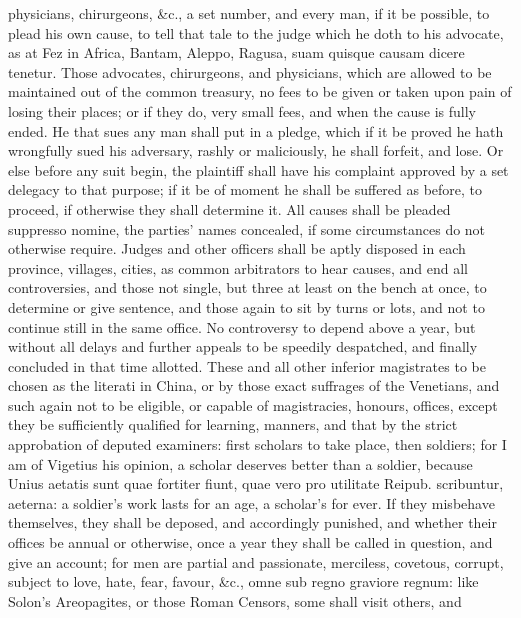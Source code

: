 {physicians, chirurgeons, \&c., a set number, and every man, if it
be possible, to plead his own cause, to tell that tale to the judge
which he doth to his advocate, as at Fez in Africa, Bantam, Aleppo,
Ragusa, suam quisque causam dicere tenetur. Those advocates,
chirurgeons, and physicians, which are allowed to be maintained
out of the common treasury, no fees to be given or taken upon pain
of losing their places; or if they do, very small fees, and when the
cause is fully ended. He that sues any man shall put in a
pledge, which if it be proved he hath wrongfully sued his adversary,
rashly or maliciously, he shall forfeit, and lose. Or else before any
suit begin, the plaintiff shall have his complaint approved by a set
delegacy to that purpose; if it be of moment he shall be suffered as
before, to proceed, if otherwise they shall determine it. All causes
shall be pleaded suppresso nomine, the parties' names concealed, if
some circumstances do not otherwise require. Judges and other officers
shall be aptly disposed in each province, villages, cities, as common
arbitrators to hear causes, and end all controversies, and those not
single, but three at least on the bench at once, to determine or give
sentence, and those again to sit by turns or lots, and not to continue
still in the same office. No controversy to depend above a year, but
without all delays and further appeals to be speedily despatched, and
finally concluded in that time allotted. These and all other inferior
magistrates to be chosen as the literati in China, or by those
exact suffrages of the Venetians, and such again not to be
eligible, or capable of magistracies, honours, offices, except they be
sufficiently qualified for learning, manners, and that by the
strict approbation of deputed examiners: first scholars to take
place, then soldiers; for I am of Vigetius his opinion, a scholar
deserves better than a soldier, because Unius aetatis sunt quae
fortiter fiunt, quae vero pro utilitate Reipub. scribuntur, aeterna: a
soldier's work lasts for an age, a scholar's for ever. If they
misbehave themselves, they shall be deposed, and accordingly
punished, and whether their offices be annual or otherwise, once a
year they shall be called in question, and give an account; for men are
partial and passionate, merciless, covetous, corrupt, subject to love,
hate, fear, favour, \&c., omne sub regno graviore regnum: like Solon's
Areopagites, or those Roman Censors, some shall visit others, and
}
